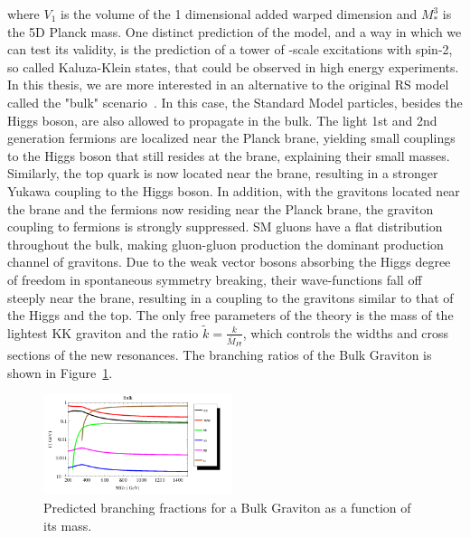 where $V_1$ is the volume of the 1 dimensional added warped dimension and $M_*^3$ is the 5D Planck mass.
One distinct prediction of the model, and a way in which we can test its validity, is the prediction of a tower of \TeV-scale excitations with spin-2, so called Kaluza-Klein states, that could be observed in high energy experiments. \newline
In this thesis, we are more interested in an alternative to the original RS model called the "bulk" scenario~\cite{PhysRevD.76.036006,Fitzpatrick:2007qr}. In this case, the Standard Model particles, besides the Higgs boson, are also allowed to propagate in the bulk. The light 1st and 2nd generation fermions are localized near the Planck brane, yielding small couplings to the Higgs boson that still resides at the \TeV brane, explaining their small masses. Similarly, the top quark is now located near the \TeV brane, resulting in a stronger Yukawa coupling to the Higgs boson. In addition, with the gravitons located near the \TeV brane and the fermions now residing near the Planck brane, the graviton coupling to fermions is strongly suppressed. SM gluons have a flat distribution throughout the bulk, making gluon-gluon production the dominant production channel of gravitons. Due to the weak vector bosons absorbing the Higgs degree of freedom in spontaneous symmetry breaking, their wave-functions fall off steeply near the \TeV brane, resulting in a coupling to the gravitons similar to that of the Higgs and the top. The only free parameters of the theory is the mass of the lightest KK graviton and the ratio $\tilde{k} = \frac{k}{\bar{M}_{Pl}}$, which controls the widths and cross sections of the new resonances. The branching ratios of the Bulk Graviton is shown in Figure~\ref{fig:theory:bulk}.
\begin{figure}[h!]
\centering
\includegraphics[width=0.49\textwidth]{figures/theory/BulkGravitonBR_tuomas.png}
\caption{Predicted branching fractions for a Bulk Graviton as a function of its mass.}
\label{fig:theory:bulk}
\end{figure}

